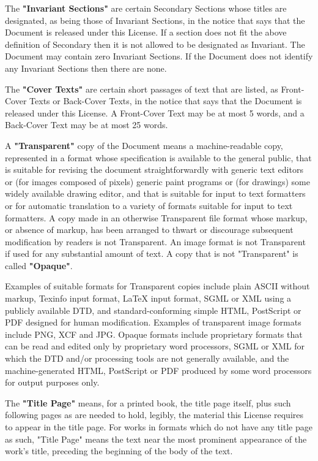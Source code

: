 \documentclass[a4paper,11pt]{article}
\begin{document}
The \textbf{"Invariant Sections"} are certain Secondary Sections whose titles
are designated, as being those of Invariant Sections, in the notice
that says that the Document is released under this License.  If a
section does not fit the above definition of Secondary then it is not
allowed to be designated as Invariant.  The Document may contain zero
Invariant Sections.  If the Document does not identify any Invariant
Sections then there are none.

The \textbf{"Cover Texts"} are certain short passages of text that are listed,
as Front-Cover Texts or Back-Cover Texts, in the notice that says that
the Document is released under this License.  A Front-Cover Text may
be at most 5 words, and a Back-Cover Text may be at most 25 words.

A \textbf{"Transparent"} copy of the Document means a machine-readable copy,
represented in a format whose specification is available to the
general public, that is suitable for revising the document
straightforwardly with generic text editors or (for images composed of
pixels) generic paint programs or (for drawings) some widely available
drawing editor, and that is suitable for input to text formatters or
for automatic translation to a variety of formats suitable for input
to text formatters.  A copy made in an otherwise Transparent file
format whose markup, or absence of markup, has been arranged to thwart
or discourage subsequent modification by readers is not Transparent.
An image format is not Transparent if used for any substantial amount
of text.  A copy that is not "Transparent" is called \textbf{"Opaque"}.

Examples of suitable formats for Transparent copies include plain
ASCII without markup, Texinfo input format, LaTeX input format, SGML
or XML using a publicly available DTD, and standard-conforming simple
HTML, PostScript or PDF designed for human modification.  Examples of
transparent image formats include PNG, XCF and JPG.  Opaque formats
include proprietary formats that can be read and edited only by
proprietary word processors, SGML or XML for which the DTD and/or
processing tools are not generally available, and the
machine-generated HTML, PostScript or PDF produced by some word
processors for output purposes only.

The \textbf{"Title Page"} means, for a printed book, the title page itself,
plus such following pages as are needed to hold, legibly, the material
this License requires to appear in the title page.  For works in
formats which do not have any title page as such, "Title Page" means
the text near the most prominent appearance of the work's title,
preceding the beginning of the body of the text.
\end{document}
